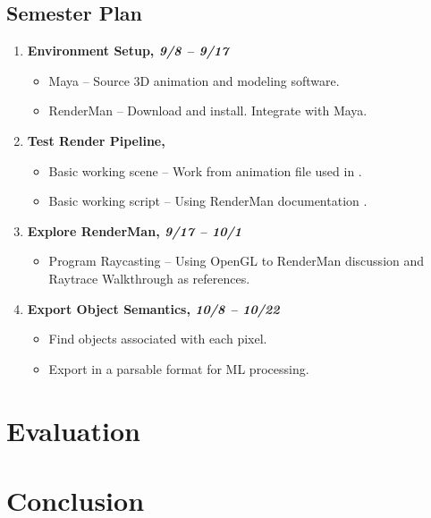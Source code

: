 \documentclass[conference]{IEEEtran}
\begin{document}
\subsection{Semester Plan}
\label{subsec:semester_plan}
\begin{enumerate}
\item \textbf{Environment Setup, \textit{9/8 -- 9/17}}
\begin{itemize}
\item Maya -- Source 3D animation and modeling software.
\item RenderMan -- Download and install. Integrate with Maya.
\end{itemize}
\item \textbf{Test Render Pipeline, \textit{}}
\begin{itemize}
\item Basic working scene -- Work from animation file used in \cite{thesis_harris}.
\item Basic working script -- Using RenderMan documentation \cite{renderman_docs}.
\end{itemize}
\item \textbf{Explore RenderMan, \textit{9/17 -- 10/1}}
\begin{itemize}
\item Program Raycasting -- Using OpenGL to RenderMan discussion \cite{renderman_opengl}
and Raytrace Walkthrough \cite{raytrace_walkthrough} as references.
\end{itemize}
\item \textbf{Export Object Semantics, \textit{10/8 -- 10/22}}
\begin{itemize}
\item Find objects associated with each pixel.
\item Export in a parsable format for ML processing.
\end{itemize}
\end{enumerate}

\section{Evaluation}
\label{sec:methods/evaluation}


\section{Conclusion}
\label{sec:conclusion}




\end{document}
